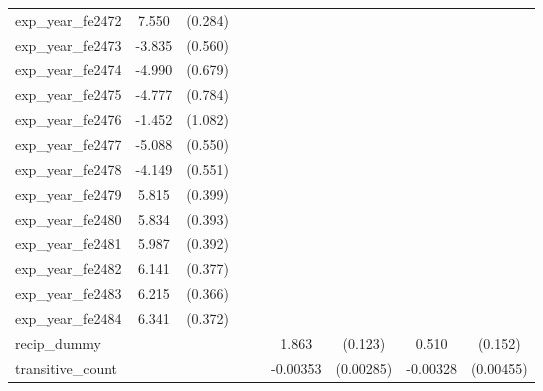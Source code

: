 {\begin{tabular}{l*{4}{cc}}
exp\_year\_fe2472&    7.550\sym{***}&  (0.284)&                  &         &                  &         &                  &         \\
exp\_year\_fe2473&   -3.835\sym{***}&  (0.560)&                  &         &                  &         &                  &         \\
exp\_year\_fe2474&   -4.990\sym{***}&  (0.679)&                  &         &                  &         &                  &         \\
exp\_year\_fe2475&   -4.777\sym{***}&  (0.784)&                  &         &                  &         &                  &         \\
exp\_year\_fe2476&   -1.452         &  (1.082)&                  &         &                  &         &                  &         \\
exp\_year\_fe2477&   -5.088\sym{***}&  (0.550)&                  &         &                  &         &                  &         \\
exp\_year\_fe2478&   -4.149\sym{***}&  (0.551)&                  &         &                  &         &                  &         \\
exp\_year\_fe2479&    5.815\sym{***}&  (0.399)&                  &         &                  &         &                  &         \\
exp\_year\_fe2480&    5.834\sym{***}&  (0.393)&                  &         &                  &         &                  &         \\
exp\_year\_fe2481&    5.987\sym{***}&  (0.392)&                  &         &                  &         &                  &         \\
exp\_year\_fe2482&    6.141\sym{***}&  (0.377)&                  &         &                  &         &                  &         \\
exp\_year\_fe2483&    6.215\sym{***}&  (0.366)&                  &         &                  &         &                  &         \\
exp\_year\_fe2484&    6.341\sym{***}&  (0.372)&                  &         &                  &         &                  &         \\
recip\_dummy&                  &         &                  &         &    1.863\sym{***}&  (0.123)&    0.510\sym{***}&  (0.152)\\
transitive\_count&                  &         &                  &         & -0.00353         &(0.00285)& -0.00328         &(0.00455)\\

\end{tabular}}
